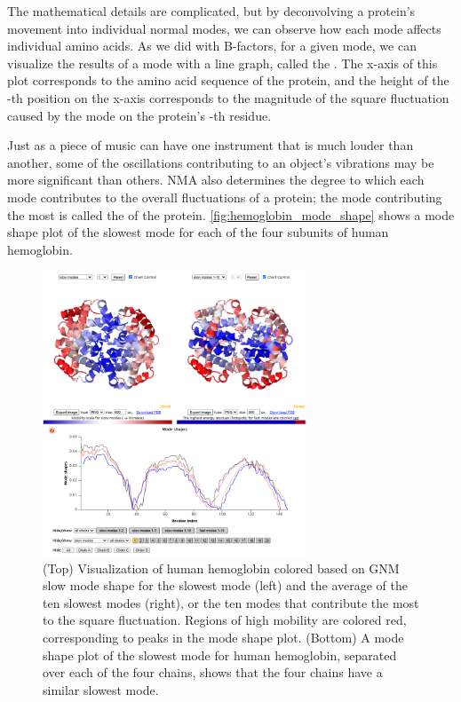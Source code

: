 The mathematical details are complicated, but by deconvolving a protein's movement into individual normal modes, we can observe how each mode affects individual amino acids. As we did with B-factors, for a given mode, we can visualize the results of a mode with a line graph, called the . The x-axis of this plot corresponds to the amino acid sequence of the protein, and the height of the -th position on the x-axis corresponds to the magnitude of the square fluctuation caused by the mode on the protein's -th residue.

Just as a piece of music can have one instrument that is much louder than another, some of the oscillations contributing to an object's vibrations may be more significant than others. NMA also determines the degree to which each mode contributes to the overall fluctuations of a protein; the mode contributing the most is called the  of the protein. \autoref{fig:hemoglobin_mode_shape} shows a mode shape plot of the slowest mode for each of the four subunits of human hemoglobin.

\begin{figure}[h]
	\centering
	\mySfFamily
	\includegraphics[width = 0.7\textwidth]{../images/hemoglobin_mode_shape.png}
	\caption{(Top) Visualization of human hemoglobin colored based on GNM slow mode shape for the slowest mode (left) and the average of the ten slowest modes (right), or the ten modes that contribute the most to the square fluctuation. Regions of high mobility are colored red, corresponding to peaks in the mode shape plot. (Bottom) A mode shape plot of the slowest mode for human hemoglobin, separated over each of the four chains, shows that the four chains have a similar slowest mode.}
	\label{fig:hemoglobin_mode_shape}
\end{figure}

